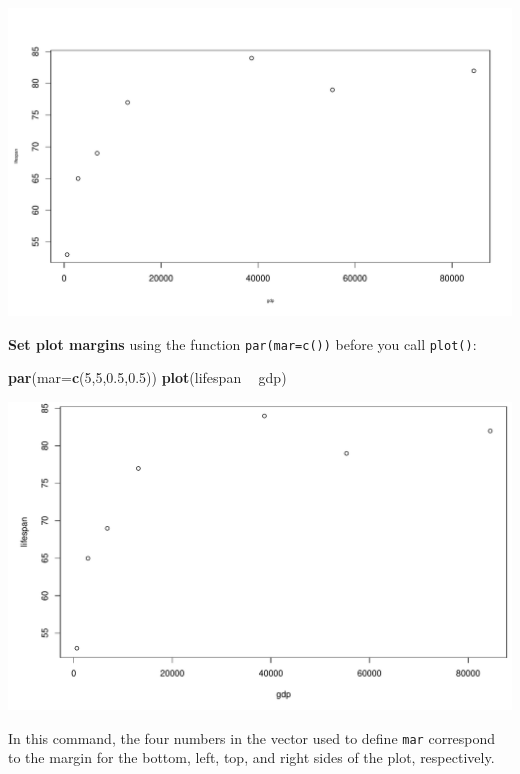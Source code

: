 \documentclass[
]{book}
\newenvironment{Shaded}{\begin{snugshade}}{\end{snugshade}}
\newcommand{\DataTypeTok}[1]{\textcolor[rgb]{0.13,0.29,0.53}{#1}}
\newcommand{\DecValTok}[1]{\textcolor[rgb]{0.00,0.00,0.81}{#1}}
\newcommand{\FloatTok}[1]{\textcolor[rgb]{0.00,0.00,0.81}{#1}}
\newcommand{\KeywordTok}[1]{\textcolor[rgb]{0.13,0.29,0.53}{\textbf{#1}}}
\newcommand{\NormalTok}[1]{#1}
\newcommand{\OperatorTok}[1]{\textcolor[rgb]{0.81,0.36,0.00}{\textbf{#1}}}
\newcommand{\StringTok}[1]{\textcolor[rgb]{0.31,0.60,0.02}{#1}}
\begin{document}
\includegraphics{figures/unnamed-chunk-111-1.pdf}

\textbf{Set plot margins} using the function \texttt{par(mar=c())} before you call \texttt{plot()}:

\begin{Shaded}
\begin{Highlighting}[]
\KeywordTok{par}\NormalTok{(}\DataTypeTok{mar=}\KeywordTok{c}\NormalTok{(}\DecValTok{5}\NormalTok{,}\DecValTok{5}\NormalTok{,}\FloatTok{0.5}\NormalTok{,}\FloatTok{0.5}\NormalTok{))}
\KeywordTok{plot}\NormalTok{(lifespan }\OperatorTok{~}\StringTok{ }\NormalTok{gdp)}
\end{Highlighting}
\end{Shaded}

\includegraphics{figures/unnamed-chunk-112-1.pdf}

In this command, the four numbers in the vector used to define \texttt{mar} correspond to the margin for the bottom, left, top, and right sides of the plot, respectively.
\end{document}
